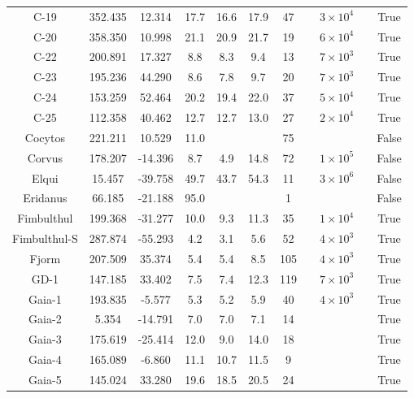 \begin{table}
\begin{tabular}{ccccccccccc}
C-19 & 352.435 & 12.314 & 17.7 & 16.6 & 17.9 & 47 & \citet{ibata:2023} & $3 \times 10^{4}$ &  & True \\
C-20 & 358.350 & 10.998 & 21.1 & 20.9 & 21.7 & 19 & \citet{ibata:2023} & $6 \times 10^{4}$ &  & True \\
C-22 & 200.891 & 17.327 & 8.8 & 8.3 & 9.4 & 13 & \citet{ibata:2023} & $7 \times 10^{3}$ &  & True \\
C-23 & 195.236 & 44.290 & 8.6 & 7.8 & 9.7 & 20 & \citet{ibata:2023} & $7 \times 10^{3}$ &  & True \\
C-24 & 153.259 & 52.464 & 20.2 & 19.4 & 22.0 & 37 & \citet{ibata:2023} & $5 \times 10^{4}$ &  & True \\
C-25 & 112.358 & 40.462 & 12.7 & 12.7 & 13.0 & 27 & \citet{ibata:2023} & $2 \times 10^{4}$ &  & True \\
Cocytos & 221.211 & 10.529 & 11.0 & & & 75 & \citet{grillmair:2009} & &  & False \\
Corvus & 178.207 & -14.396 & 8.7 & 4.9 & 14.8 & 72 & \citet{mateu:2018} & $1 \times 10^{5}$ & \citet{mateu:2018} & False \\
Elqui & 15.457 & -39.758 & 49.7 & 43.7 & 54.3 & 11 & \citet{shipp:2019} & $3 \times 10^{6}$ & \citet{shipp:2018} & False \\
Eridanus & 66.185 & -21.188 & 95.0 & & & 1 & \citet{myeong:2017} & &  & False \\
Fimbulthul & 199.368 & -31.277 & 10.0 & 9.3 & 11.3 & 35 & \citet{ibata:2023} & $1 \times 10^{4}$ &  & True \\
Fimbulthul-S & 287.874 & -55.293 & 4.2 & 3.1 & 5.6 & 52 & \citet{ibata:2023} & $4 \times 10^{3}$ &  & True \\
Fjorm & 207.509 & 35.374 & 5.4 & 5.4 & 8.5 & 105 & \citet{ibata:2023} & $4 \times 10^{3}$ &  & True \\
GD-1 & 147.185 & 33.402 & 7.5 & 7.4 & 12.3 & 119 & \citet{ibata:2023} & $7 \times 10^{3}$ &  & True \\
Gaia-1 & 193.835 & -5.577 & 5.3 & 5.2 & 5.9 & 40 & \citet{ibata:2023} & $4 \times 10^{3}$ &  & True \\
Gaia-2 & 5.354 & -14.791 & 7.0 & 7.0 & 7.1 & 14 & \citet{ibata:2021} & &  & True \\
Gaia-3 & 175.619 & -25.414 & 12.0 & 9.0 & 14.0 & 18 & \citet{malhan:2018} & &  & True \\
Gaia-4 & 165.089 & -6.860 & 11.1 & 10.7 & 11.5 & 9 & \citet{malhan:2018} & &  & True \\
Gaia-5 & 145.024 & 33.280 & 19.6 & 18.5 & 20.5 & 24 & \citet{malhan:2018} & &  & True \\

\end{tabular}
\end{table}
